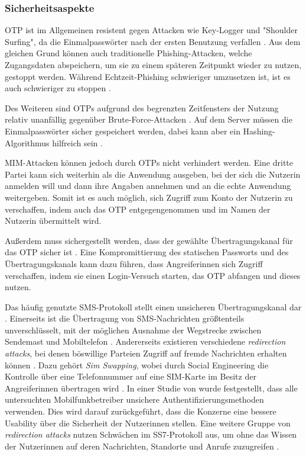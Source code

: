 \subsubsection{Sicherheitsaspekte}

\ac{OTP} ist im Allgemeinen resistent gegen Attacken wie Key-Logger und "Shoulder Surfing", da die Einmalpasswörter nach der ersten Benutzung verfallen \parencite{abhishekComprehensiveStudy2013}. Aus dem gleichen Grund können auch traditionelle Phishing-Attacken, welche Zugangsdaten abspeichern, um sie zu einem späteren Zeitpunkt wieder zu nutzen, gestoppt werden. Während Echtzeit-Phishing schwieriger umzusetzen ist, ist es auch schwieriger zu stoppen \parencite{langSecurityKeys2017}.

Des Weiteren sind \acp{OTP} aufgrund des begrenzten Zeitfensters der Nutzung relativ unanfällig gegenüber Brute-Force-Attacken \parencite{reeseUsabilityStudy2019}. Auf dem Server müssen die Einmalpasswörter sicher gespeichert werden, dabei kann aber ein Hashing-Algorithmus hilfreich sein \parencite{reeseUsabilityStudy2019}.

\ac{MIM}-Attacken können jedoch durch \acp{OTP} nicht verhindert werden. Eine dritte Partei kann sich weiterhin als die Anwendung ausgeben, bei der sich die Nutzerin anmelden will und dann ihre Angaben annehmen und an die echte Anwendung weitergeben. Somit ist es auch möglich, sich Zugriff zum Konto der Nutzerin zu verschaffen, indem auch das \ac{OTP} entgegengenommen und im Namen der Nutzerin übermittelt wird.

\pskip
Außerdem muss sichergestellt werden, dass der gewählte Übertragungskanal für das \ac{OTP} sicher ist \parencite{abhishekComprehensiveStudy2013}. Eine Kompromittierung des statischen Passworts und des Übertragungskanals kann dazu führen, dass Angreiferinnen sich Zugriff verschaffen, indem sie einen Login-Versuch starten, das \ac{OTP} abfangen und dieses nutzen.

Das häufig genutzte SMS-Protokoll stellt einen unsicheren Übertragungskanal dar \parencite{peetersSMSOTP2022}. Einerseits ist die Übertragung von SMS-Nachrichten größtenteils unverschlüsselt, mit der möglichen Ausnahme der Wegstrecke zwischen Sendemast und Mobiltelefon \parencite{peetersSMSOTP2022}. Andererseits existieren verschiedene \textit{redirection attacks}, bei denen böswillige Parteien Zugriff auf fremde Nachrichten erhalten können \parencite{peetersSMSOTP2022}. Dazu gehört \textit{Sim Swapping}, wobei durch Social Engineering die Kontrolle über eine Telefonnummer auf eine SIM-Karte im Besitz der Angreiferinnen übertragen wird \parencite{leeEmpiricalStudy2020}. In einer Studie von \textcite{leeEmpiricalStudy2020} wurde festgestellt, dass alle untersuchten Mobilfunkbetreiber unsichere Authentifizierungsmethoden verwenden. Dies wird darauf zurückgeführt, dass die Konzerne eine bessere Usability über die Sicherheit der Nutzerinnen stellen. Eine weitere Gruppe von \textit{redirection attacks} nutzen Schwächen im \ac{SS7}-Protokoll aus, um ohne das Wissen der Nutzerinnen auf deren Nachrichten, Standorte und Anrufe zuzugreifen \parencite{ullahSS7Vulnerabilities2020}.

